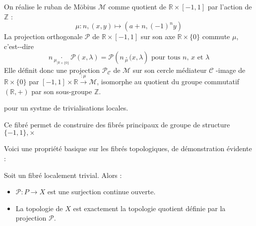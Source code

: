 \begin{exem}
On r\'ealise le ruban de M\"obius $\mathcal{M}$ comme quotient de $\mathbb{R} \times [-1,1]$ par l'action de $\mathbb{Z}$ : %
\[\mu :n,(x,y) \mapsto (a+n,(-1)^ny)\]
La projection orthogonale $\mathcal{P}$ de $\mathbb{R} \times [-1,1]$ sur son axe $\mathbb{R} \times \{0\}$ %
commute  $\mu$, c'est--dire
\[n\underset{\mu_{|\mathbb{R}\times\{0\}}}{\cdot}\mathcal{P}(x,\lambda)=%
\mathcal{P}\left(n\underset{\mu}{\cdot}(x,\lambda\right)\text{ pour tous $n$, $x$ et $\lambda$}\]
Elle d\'efinit donc une projection $\mathcal{P}_{\mathcal{C}}$ de $\mathcal{M}$ sur son cercle m\'ediateur $\mathcal{C}$ %
-image de $\mathbb{R}\times\{0\}$ par $[-1,1]\times\mathbb{R}\xrightarrow{:\mu}\mathcal{M}$, %
isomorphe au quotient du groupe commutatif $(\mathbb{R},+)$ par son sous-groupe $\mathbb{Z}$.
\par
\re pour un systme de trivialisations locales.
\end{exem}

Ce fibr\'e permet de construire des fibr\'es principaux de groupe de structure $\{-1,1\},\times$ \tr

Voici une propri\'et\'e basique sur les fibr\'es topologiques, de d\'emonstration \'evidente :

\begin{prop}
Soit \Fiy un fibr\'e localement trivial. Alors :
\begin{itemize}
\item $\mathcal{P}:P\rightarrow X$ est une surjection continue ouverte.
\item La topologie de $X$ est exactement la topologie quotient d\'efinie par la projection $\mathcal{P}$.
\end{itemize}
\end{prop}

